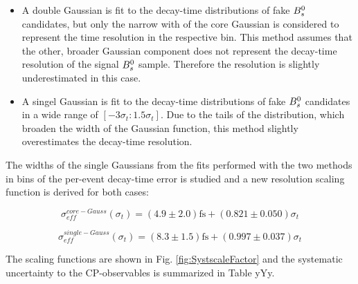 \begin{itemize}

\item A double Gaussian is fit to the decay-time distributions of fake ${{B}^0_{s}}$ candidates, but only the narrow with of the core Gaussian is considered to represent the time resolution in the respective bin. 
This method assumes that the other, broader Gaussian component does not represent the decay-time resolution of the signal ${{B}^0_{s}}$ sample. Therefore the resolution is slightly underestimated in this case.

\item A singel Gaussian is fit to the decay-time distributions of fake ${{B}^0_{s}}$ candidates in a wide range of $[-3\sigma_{t} : 1.5\sigma_{t}]$. 
Due to the tails of the distribution, which broaden the width of the Gaussian function, this method slightly overestimates the decay-time resolution.   

\end{itemize}

The widths of the single Gaussians from the fits performed with the two methods in bins of the per-event decay-time error is studied and a new resolution scaling function is derived for both cases: \newline

\begin{equation}
\sigma_{eff}^{core-Gauss}(\sigma_t) = \left(4.9  \pm 2.0 \right) \text{fs} + \left( 0.821 \pm 0.050 \right) \sigma_t
\label{eq:ResoSyst1}
\end{equation}

\begin{equation}
\sigma_{eff}^{single-Gauss}(\sigma_t) = \left(8.3  \pm 1.5 \right) \text{fs} + \left( 0.997 \pm 0.037 \right) \sigma_t
\label{eq:ResoSyst2}
\end{equation}

The scaling functions are shown in Fig. \ref{fig:SystscaleFactor} and the systematic uncertainty to the CP-observables is summarized in Table yYy.


